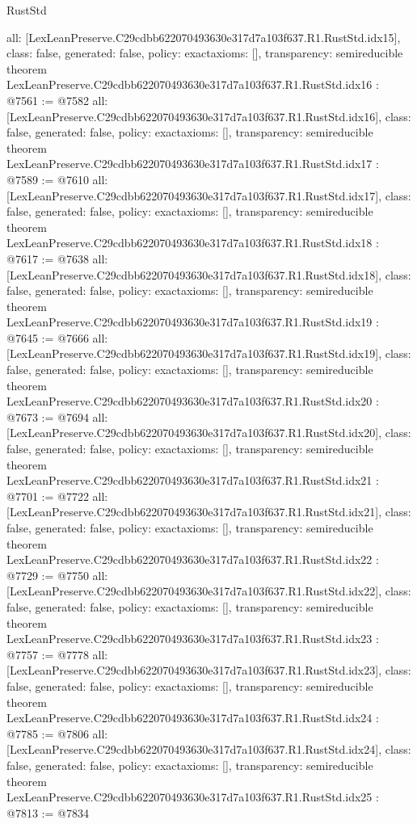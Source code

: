 \begin{lexlean}{RustStd}
\begin{coremodule}
{  all: [LexLeanPreserve.C29cdbb622070493630e317d7a103f637.R1.RustStd.idx15],
  class: false,
  generated: false,
  policy: exact{axioms: []},
  transparency: semireducible
}
theorem LexLeanPreserve.C29cdbb622070493630e317d7a103f637.R1.RustStd.idx16 : @7561 := @7582 {
  all: [LexLeanPreserve.C29cdbb622070493630e317d7a103f637.R1.RustStd.idx16],
  class: false,
  generated: false,
  policy: exact{axioms: []},
  transparency: semireducible
}
theorem LexLeanPreserve.C29cdbb622070493630e317d7a103f637.R1.RustStd.idx17 : @7589 := @7610 {
  all: [LexLeanPreserve.C29cdbb622070493630e317d7a103f637.R1.RustStd.idx17],
  class: false,
  generated: false,
  policy: exact{axioms: []},
  transparency: semireducible
}
theorem LexLeanPreserve.C29cdbb622070493630e317d7a103f637.R1.RustStd.idx18 : @7617 := @7638 {
  all: [LexLeanPreserve.C29cdbb622070493630e317d7a103f637.R1.RustStd.idx18],
  class: false,
  generated: false,
  policy: exact{axioms: []},
  transparency: semireducible
}
theorem LexLeanPreserve.C29cdbb622070493630e317d7a103f637.R1.RustStd.idx19 : @7645 := @7666 {
  all: [LexLeanPreserve.C29cdbb622070493630e317d7a103f637.R1.RustStd.idx19],
  class: false,
  generated: false,
  policy: exact{axioms: []},
  transparency: semireducible
}
theorem LexLeanPreserve.C29cdbb622070493630e317d7a103f637.R1.RustStd.idx20 : @7673 := @7694 {
  all: [LexLeanPreserve.C29cdbb622070493630e317d7a103f637.R1.RustStd.idx20],
  class: false,
  generated: false,
  policy: exact{axioms: []},
  transparency: semireducible
}
theorem LexLeanPreserve.C29cdbb622070493630e317d7a103f637.R1.RustStd.idx21 : @7701 := @7722 {
  all: [LexLeanPreserve.C29cdbb622070493630e317d7a103f637.R1.RustStd.idx21],
  class: false,
  generated: false,
  policy: exact{axioms: []},
  transparency: semireducible
}
theorem LexLeanPreserve.C29cdbb622070493630e317d7a103f637.R1.RustStd.idx22 : @7729 := @7750 {
  all: [LexLeanPreserve.C29cdbb622070493630e317d7a103f637.R1.RustStd.idx22],
  class: false,
  generated: false,
  policy: exact{axioms: []},
  transparency: semireducible
}
theorem LexLeanPreserve.C29cdbb622070493630e317d7a103f637.R1.RustStd.idx23 : @7757 := @7778 {
  all: [LexLeanPreserve.C29cdbb622070493630e317d7a103f637.R1.RustStd.idx23],
  class: false,
  generated: false,
  policy: exact{axioms: []},
  transparency: semireducible
}
theorem LexLeanPreserve.C29cdbb622070493630e317d7a103f637.R1.RustStd.idx24 : @7785 := @7806 {
  all: [LexLeanPreserve.C29cdbb622070493630e317d7a103f637.R1.RustStd.idx24],
  class: false,
  generated: false,
  policy: exact{axioms: []},
  transparency: semireducible
}
theorem LexLeanPreserve.C29cdbb622070493630e317d7a103f637.R1.RustStd.idx25 : @7813 := @7834 {
}
\end{coremodule}
\end{lexlean}
